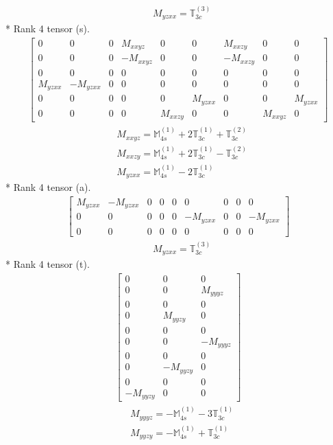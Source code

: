 \documentclass[fleqn,8pt,landscape]{jsarticle}
\begin{document}
\begin{align*}
& M_{yzxx} = \mathbb{T}_{3c}^{(3)}
\end{align*}
* Rank 4 tensor (s).
\begin{align*}
\begin{bmatrix} 0 & 0 & 0 & M_{xxyz} & 0 & 0 & M_{xxzy} & 0 & 0 \\ 0 & 0 & 0 & - M_{xxyz} & 0 & 0 & - M_{xxzy} & 0 & 0 \\ 0 & 0 & 0 & 0 & 0 & 0 & 0 & 0 & 0 \\ M_{yzxx} & - M_{yzxx} & 0 & 0 & 0 & 0 & 0 & 0 & 0 \\ 0 & 0 & 0 & 0 & 0 & M_{yzxx} & 0 & 0 & M_{yzxx} \\ 0 & 0 & 0 & 0 & M_{xxzy} & 0 & 0 & M_{xxyz} & 0 \end{bmatrix}
\end{align*}
\begin{align*}
& M_{xxyz} = \mathbb{M}_{4s}^{(1)} + 2 \mathbb{T}_{3c}^{(1)} + \mathbb{T}_{3c}^{(2)} \\
& M_{xxzy} = \mathbb{M}_{4s}^{(1)} + 2 \mathbb{T}_{3c}^{(1)} - \mathbb{T}_{3c}^{(2)} \\
& M_{yzxx} = \mathbb{M}_{4s}^{(1)} - 2 \mathbb{T}_{3c}^{(1)}
\end{align*}
* Rank 4 tensor (a).
\begin{align*}
\begin{bmatrix} M_{yzxx} & - M_{yzxx} & 0 & 0 & 0 & 0 & 0 & 0 & 0 \\ 0 & 0 & 0 & 0 & 0 & - M_{yzxx} & 0 & 0 & - M_{yzxx} \\ 0 & 0 & 0 & 0 & 0 & 0 & 0 & 0 & 0 \end{bmatrix}
\end{align*}
\begin{align*}
& M_{yzxx} = \mathbb{T}_{3c}^{(3)}
\end{align*}
* Rank 4 tensor (t).
\begin{align*}
\begin{bmatrix} 0 & 0 & 0 \\ 0 & 0 & M_{yyyz} \\ 0 & 0 & 0 \\ 0 & M_{yyzy} & 0 \\ 0 & 0 & 0 \\ 0 & 0 & - M_{yyyz} \\ 0 & 0 & 0 \\ 0 & - M_{yyzy} & 0 \\ 0 & 0 & 0 \\ - M_{yyzy} & 0 & 0 \end{bmatrix}
\end{align*}
\begin{align*}
& M_{yyyz} = - \mathbb{M}_{4s}^{(1)} - 3 \mathbb{T}_{3c}^{(1)} \\
& M_{yyzy} = - \mathbb{M}_{4s}^{(1)} + \mathbb{T}_{3c}^{(1)}
\end{align*}
\end{document}
